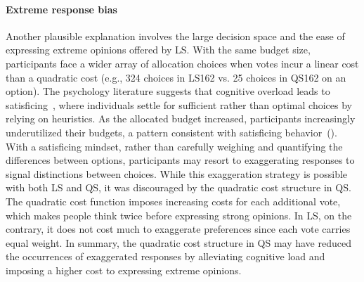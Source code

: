\paragraph{Extreme response bias}
Another plausible explanation involves the large decision space and the ease of expressing extreme opinions offered by LS. With the same budget size, participants face a wider array of allocation choices when votes incur a linear cost than a quadratic cost (e.g., 324 choices in LS162 vs. 25 choices in QS162 on an option). The psychology literature suggests that cognitive overload leads to satisficing~\cite{schwartzMaximizingSatisficingHappiness2002, iyengarWhenChoiceDemotivating2000}, where individuals settle for sufficient rather than optimal choices by relying on heuristics. As the allocated budget increased, participants increasingly underutilized their budgets, a pattern consistent with satisficing behavior~(). With a satisficing mindset, rather than carefully weighing and quantifying the differences between options, participants may resort to exaggerating responses to signal distinctions between choices. While this exaggeration strategy is possible with both LS and QS, it was discouraged by the quadratic cost structure in QS. The quadratic cost function imposes increasing costs for each additional vote, which makes people think twice before expressing strong opinions. In LS, on the contrary, it does not cost much to exaggerate preferences since each vote carries equal weight. In summary, the quadratic cost structure in QS may have reduced the occurrences of exaggerated responses by alleviating cognitive load and imposing a higher cost to expressing extreme opinions.

